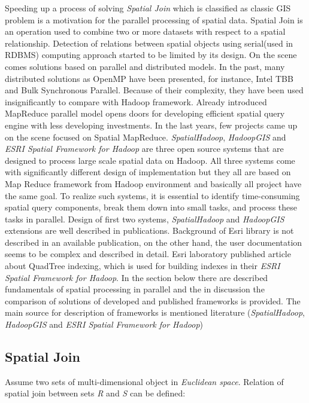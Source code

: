 \documentclass[a4paper,12pt,oneside]{report}
\begin{document}
Speeding up a process of solving \textit{Spatial Join} which is classified as classic GIS 
problem is a motivation for the parallel processing of spatial data. Spatial Join 
is an operation used to combine two or more datasets with respect to a spatial 
relationship. Detection of relations between spatial objects using serial(used in RDBMS) 
computing approach started to be limited by its design. On the scene comes solutions
based on parallel and distributed models. In the past, many distributed 
solutions as OpenMP\cite{omp} have been presented, for instance, Intel TBB and Bulk Synchronous Parallel\cite{multi_cpu}.
Because of their complexity, they have been used insignificantly to compare with Hadoop framework.
Already introduced MapReduce parallel model opens doors for developing efficient
spatial query engine with less developing investments. In the last years,  
few projects came up on the scene  focused on Spatial MapReduce.
\textit{SpatialHadoop}\cite{spatialhadoop}, \textit{HadoopGIS}\cite{hadoopGIS} and \textit{ESRI Spatial Framework for Hadoop}\cite{esri_framework}
are three open source systems that are designed to process large scale spatial data on Hadoop.
All three systems come with significantly different design of implementation but they all are based
on Map Reduce framework from Hadoop environment and basically all project have the same goal.
To realize such systems, it is essential to identify time-consuming spatial query components,
break them down into small tasks, and process these tasks in parallel. 
Design of first two systems, \textit{SpatialHadoop} and \textit{HadoopGIS}
extensions are well described in publications. Background of Esri library is not described in an available
publication, on the other hand, the user documentation seems to be complex and described in detail. 
Esri laboratory published article\cite{esri_indexing} about QuadTree indexing, which is used for building 
indexes in their \textit{ESRI Spatial Framework for Hadoop}.
In the section below there are described fundamentals of spatial processing in parallel and the in discussion 
the comparison of solutions of developed and published frameworks is provided. The main source for description 
of frameworks is mentioned literature (\textit{SpatialHadoop}\cite{spatialhadoop}, \textit{HadoopGIS}\cite{hadoopGIS} 
and \textit{ESRI Spatial Framework for Hadoop}\cite{esri_framework})

		
\subsection{Spatial Join}
\label{sub:spatial_join}
Assume two sets of multi-dimensional object in \emph{Euclidean space}. Relation of spatial 
join between sets \emph{R} and \emph{S} can be defined\cite{spatial_join2}:
\end{document}
